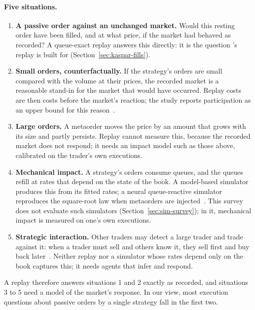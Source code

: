 \paragraph{Five situations.}
\begin{enumerate}[leftmargin=1.8em,itemsep=2pt]
\item \textbf{A passive order against an unchanged market.} Would this resting order have been filled, and at what
  price, if the market had behaved as recorded? A queue-exact replay answers this directly: it is the question
  \kasparhft{}'s replay is built for (Section~\ref{sec:kaspar-fills}).
\item \textbf{Small orders, counterfactually.} If the strategy's orders are small compared with the volume at their
  prices, the recorded market is a reasonable stand-in for the market that would have occurred. Replay costs are then
  costs before the market's reaction; the \kasparhft{} study reports participation as an upper bound for this
  reason~\citep{maciejewski_shadow}.
\item \textbf{Large orders.} A metaorder moves the price by an amount that grows with its size and partly persists.
  Replay cannot measure this, because the recorded market does not respond; it needs an impact model such as those
  above, calibrated on the trader's own executions.
\item \textbf{Mechanical impact.} A strategy's orders consume queues, and the queues refill at rates that depend on
  the state of the book. A model-based simulator produces this from its fitted rates; a neural queue-reactive simulator
  reproduces the square-root law when metaorders are injected~\citep{deepqr}. This survey does not evaluate such
  simulators (Section~\ref{sec:sim-survey}); in it, mechanical impact is measured on one's own executions.
\item \textbf{Strategic interaction.} Other traders may detect a large trader and trade against it: when a trader
  must sell and others know it, they sell first and buy back later~\citep{brunnermeier2005}. Neither replay nor a
  simulator whose rates depend only on the book captures this; it needs agents that infer and respond.
\end{enumerate}
A replay therefore answers situations 1 and 2 exactly as recorded, and situations 3 to 5 need a model of the market's
response. In our view, most execution questions about passive orders by a single strategy fall in the first two.

